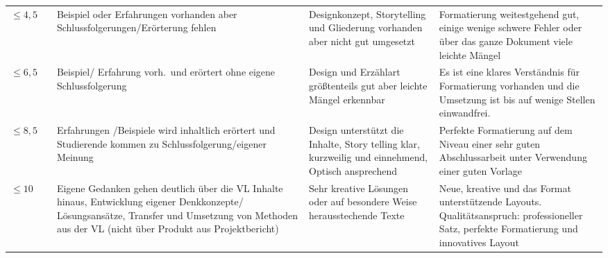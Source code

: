 \documentclass[DIV=15,headinclude=true]{scrreprt}
\begin{document}
{\begin{landscape}
\begin{table}[]
{\begin{tabulary}{\linewidth}{JJJJJ}
					$\leq 4,5$     &                                                                                                               & Beispiel oder   Erfahrungen vorhanden aber Schlussfolgerungen/Erörterung fehlen                                                                                                                           & Designkonzept, Storytelling und   Gliederung vorhanden aber nicht gut umgesetzt                                   & Formatierung weitestgehend gut,   einige wenige schwere Fehler oder über das ganze Dokument viele leichte   Mängel                                                                                                                                                                                   \\ 
$\leq 6,5$     &                                                                                                               & Beispiel/   Erfahrung vorh.\ und erörtert ohne eigene Schlussfolgerung                                                                                                                                     & Design und Erzählart   größtenteils gut aber leichte Mängel erkennbar                                              & Es ist eine klares Verständnis   für Formatierung vorhanden und die Umsetzung ist bis auf wenige Stellen   einwandfrei.                                                                                                                                                                               \\
$\leq 8,5$     &                                                                                                               & Erfahrungen   /Beispiele wird inhaltlich erörtert und Studierende kommen zu   Schlussfolgerung/eigener Meinung                                                                                            & Design unterstützt die Inhalte,   Story telling klar, kurzweilig und einnehmend, Optisch ansprechend               & Perfekte Formatierung auf dem   Niveau einer sehr guten Abschlussarbeit unter Verwendung einer guten Vorlage                                                                                                                                                                                         \\
$\leq 10$      &                                                                                                             & Eigene Gedanken   gehen deutlich über die VL Inhalte hinaus, Entwicklung eigener Denkkonzepte/   Lösungsansätze, Transfer und Umsetzung von Methoden aus der VL (nicht über   Produkt aus Projektbericht) & Sehr kreative Lösungen oder auf   besondere Weise herausstechende Texte                                            & Neue, kreative und das Format   unterstützende Layouts. Qualitätsanspruch: professioneller Satz, perfekte   Formatierung und innovatives Layout    \\ \bottomrule                                                                                                                                                 




\end{tabulary}}
\end{table}
\end{landscape}}
\end{document}
